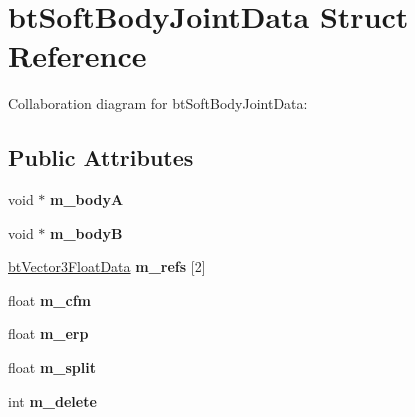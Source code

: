\hypertarget{structbt_soft_body_joint_data}{\section{bt\+Soft\+Body\+Joint\+Data Struct Reference}
\label{structbt_soft_body_joint_data}
}


Collaboration diagram for bt\+Soft\+Body\+Joint\+Data\+:
\subsection*{Public Attributes}
\begin{DoxyCompactItemize}
\item 
\hypertarget{structbt_soft_body_joint_data_aa0c5fe576669547704c7e97a11fa1b79}{void $\ast$ {\bfseries m\+\_\+body\+A}}\label{structbt_soft_body_joint_data_aa0c5fe576669547704c7e97a11fa1b79}

\item 
\hypertarget{structbt_soft_body_joint_data_a4db68941d63ea7141412ce8582d1346b}{void $\ast$ {\bfseries m\+\_\+body\+B}}\label{structbt_soft_body_joint_data_a4db68941d63ea7141412ce8582d1346b}

\item 
\hypertarget{structbt_soft_body_joint_data_a317d5254a5a5bb919d1780caabad226a}{\hyperlink{structbt_vector3_float_data}{bt\+Vector3\+Float\+Data} {\bfseries m\+\_\+refs} \mbox{[}2\mbox{]}}\label{structbt_soft_body_joint_data_a317d5254a5a5bb919d1780caabad226a}

\item 
\hypertarget{structbt_soft_body_joint_data_a277938182c7715a1e9d25a4d5c4a4883}{float {\bfseries m\+\_\+cfm}}\label{structbt_soft_body_joint_data_a277938182c7715a1e9d25a4d5c4a4883}

\item 
\hypertarget{structbt_soft_body_joint_data_a01f10d72c14307a7fbe04cac64457a15}{float {\bfseries m\+\_\+erp}}\label{structbt_soft_body_joint_data_a01f10d72c14307a7fbe04cac64457a15}

\item 
\hypertarget{structbt_soft_body_joint_data_a8eb9aaf8d03ec99c8d36f9a16d62d075}{float {\bfseries m\+\_\+split}}\label{structbt_soft_body_joint_data_a8eb9aaf8d03ec99c8d36f9a16d62d075}

\item 
\hypertarget{structbt_soft_body_joint_data_a38653218fd5c6b336e66564d7e433e52}{int {\bfseries m\+\_\+delete}}\label{structbt_soft_body_joint_data_a38653218fd5c6b336e66564d7e433e52}


\end{DoxyCompactItemize}
